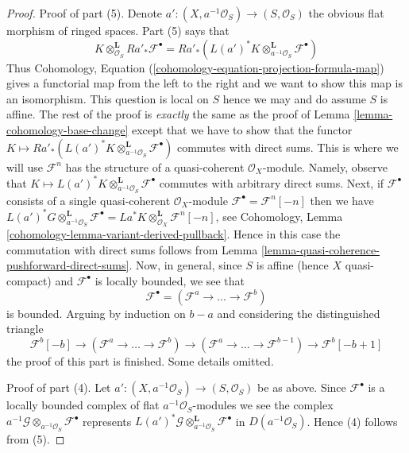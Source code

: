 \begin{proof}
\medskip\noindent
Proof of part (5). Denote
$a' : (X, a^{-1}\mathcal{O}_S) \to (S, \mathcal{O}_S)$
the obvious flat morphism of ringed spaces. Part (5) says that
$$
K \otimes_{\mathcal{O}_S}^\mathbf{L} Ra'_*\mathcal{F}^\bullet =
Ra'_*(L(a')^*K \otimes_{a^{-1}\mathcal{O}_S}^\mathbf{L}
\mathcal{F}^\bullet)
$$
Thus
Cohomology, Equation (\ref{cohomology-equation-projection-formula-map})
gives a functorial map from the left to the right and we want to show
this map is an isomorphism.
This question is local on $S$ hence we may and do assume $S$
is affine. The rest of the proof is {\it exactly} the same as the
proof of Lemma \ref{lemma-cohomology-base-change} except that we have
to show that the functor
$K \mapsto Ra'_*(L(a')^*K \otimes_{a^{-1}\mathcal{O}_S}^\mathbf{L}
\mathcal{F}^\bullet)$ commutes with direct sums.
This is where we will use $\mathcal{F}^n$ has the structure
of a quasi-coherent $\mathcal{O}_X$-module. Namely, observe that
$K \mapsto L(a')^*K
\otimes_{a^{-1}\mathcal{O}_S}^\mathbf{L} \mathcal{F}^\bullet$
commutes with arbitrary direct sums. Next, if
$\mathcal{F}^\bullet$ consists of a single quasi-coherent
$\mathcal{O}_X$-module $\mathcal{F}^\bullet = \mathcal{F}^n[-n]$
then we have $L(a')^*G
\otimes_{a^{-1}\mathcal{O}_S}^\mathbf{L} \mathcal{F}^\bullet =
La^*K \otimes_{\mathcal{O}_X}^\mathbf{L} \mathcal{F}^n[-n]$, see
Cohomology, Lemma \ref{cohomology-lemma-variant-derived-pullback}.
Hence in this case the commutation with direct sums follows from
Lemma \ref{lemma-quasi-coherence-pushforward-direct-sums}.
Now, in general, since $S$ is affine (hence $X$ quasi-compact)
and $\mathcal{F}^\bullet$ is locally bounded, we see that
$$
\mathcal{F}^\bullet = (\mathcal{F}^a \to \ldots \to \mathcal{F}^b)
$$
is bounded. Arguing by induction on $b - a$ and considering the
distinguished triangle
$$
\mathcal{F}^b[-b] \to (\mathcal{F}^a \to \ldots \to \mathcal{F}^b)
\to (\mathcal{F}^a \to \ldots \to \mathcal{F}^{b - 1}) \to
\mathcal{F}^b[-b + 1]
$$
the proof of this part is finished. Some details omitted.

\medskip\noindent
Proof of part (4). Let $a' : (X, a^{-1}\mathcal{O}_S) \to (S, \mathcal{O}_S)$
be as above. Since $\mathcal{F}^\bullet$ is a locally bounded
complex of flat $a^{-1}\mathcal{O}_S$-modules we see the complex
$a^{-1}\mathcal{G} \otimes_{a^{-1}\mathcal{O}_S} \mathcal{F}^\bullet$
represents $L(a')^*\mathcal{G}
\otimes_{a^{-1}\mathcal{O}_S}^\mathbf{L}
\mathcal{F}^\bullet$ in $D(a^{-1}\mathcal{O}_S)$. Hence (4)
follows from (5).
\end{proof}

